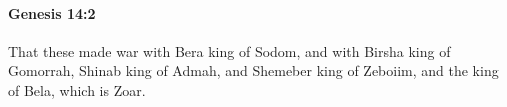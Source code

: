 
		\paragraph{Genesis 14:2} %
			\label{GENESIS-14-2}

			That these made war with Bera king of Sodom, and with Birsha king of Gomorrah, Shinab king of Admah, and Shemeber king of Zeboiim, and the king of Bela, which is Zoar.



